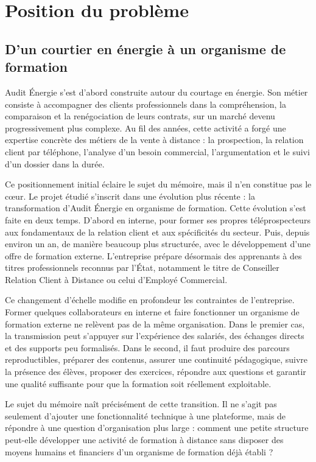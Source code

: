 \section{Position du problème}

\subsection{D'un courtier en énergie à un organisme de formation}

Audit Énergie s'est d'abord construite autour du courtage en énergie. Son métier consiste
à accompagner des clients professionnels dans la compréhension, la comparaison et la
renégociation de leurs contrats, sur un marché devenu progressivement plus complexe. Au
fil des années, cette activité a forgé une expertise concrète des métiers de la vente à
distance : la prospection, la relation client par téléphone, l'analyse d'un besoin
commercial, l'argumentation et le suivi d'un dossier dans la durée.

Ce positionnement initial éclaire le sujet du mémoire, mais il n'en constitue pas le cœur.
Le projet étudié s'inscrit dans une évolution plus récente : la transformation d'Audit
Énergie en organisme de formation. Cette évolution s'est faite en deux temps. D'abord en
interne, pour former ses propres téléprospecteurs aux fondamentaux de la relation client
et aux spécificités du secteur. Puis, depuis environ un an, de manière beaucoup plus
structurée, avec le développement d'une offre de formation externe. L'entreprise prépare
désormais des apprenants à des titres professionnels reconnus par l'État, notamment le
titre de Conseiller Relation Client à Distance ou celui d'Employé Commercial.

Ce changement d'échelle modifie en profondeur les contraintes de l'entreprise. Former
quelques collaborateurs en interne et faire fonctionner un organisme de formation externe
ne relèvent pas de la même organisation. Dans le premier cas, la transmission peut
s'appuyer sur l'expérience des salariés, des échanges directs et des supports peu
formalisés. Dans le second, il faut produire des parcours reproductibles, préparer des
contenus, assurer une continuité pédagogique, suivre la présence des élèves, proposer des
exercices, répondre aux questions et garantir une qualité suffisante pour que la formation
soit réellement exploitable.

Le sujet du mémoire naît précisément de cette transition. Il ne s'agit pas seulement
d'ajouter une fonctionnalité technique à une plateforme, mais de répondre à une question
d'organisation plus large : comment une petite structure peut-elle développer une activité
de formation à distance sans disposer des moyens humains et financiers d'un organisme de
formation déjà établi ?

